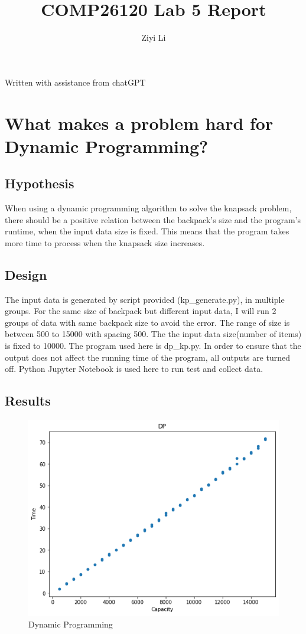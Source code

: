 \documentclass[a4]{article}
\title{COMP26120 Lab 5 Report}
\author{Ziyi Li}
\begin{document}
\maketitle
Written with assistance from chatGPT

\section{What makes a problem hard for Dynamic Programming?}

\subsection{Hypothesis}

When using a dynamic programming algorithm to solve the knapsack problem, there should be a positive relation between the backpack's size and the program's runtime, when the input data size is fixed. This means that the program takes more time to process when the knapsack size increases.

\subsection{Design}

The input data is generated by script provided (kp\_generate.py), in multiple groups. For the same size of backpack but different input data, I will run 2 groups of data with same backpack size to avoid the error. The range of size is between 500 to 15000 with spacing 500. The the input data size(number of items) is fixed to 10000. The program used here is dp\_kp.py. In order to ensure that the output does not affect the running time of the program, all outputs are turned off. Python Jupyter Notebook is used here to run test and collect data.

\subsection{Results}
\begin{figure}[H]
    \begin{minipage}{0.45\textwidth}
    \includegraphics[width=2\textwidth]{dp.png}
    \caption{Dynamic Programming}
    \end{minipage}
\end{figure}
\end{document}
